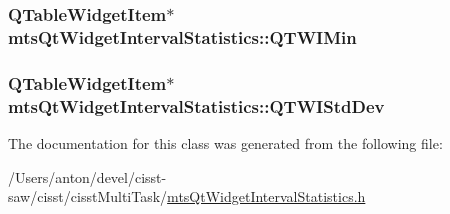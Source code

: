 \subsubsection[{Q\+T\+W\+I\+Min}]{\setlength{\rightskip}{0pt plus 5cm}Q\+Table\+Widget\+Item$\ast$ mts\+Qt\+Widget\+Interval\+Statistics\+::\+Q\+T\+W\+I\+Min\hspace{0.3cm}{\ttfamily [protected]}}\label{classmts_qt_widget_interval_statistics_aea3548dcfa553d0e74440d7b8d6aa1a7}
\hypertarget{classmts_qt_widget_interval_statistics_aee0f20cac1a5a0b0f44389a5154ca58f}{}
\subsubsection[{Q\+T\+W\+I\+Std\+Dev}]{\setlength{\rightskip}{0pt plus 5cm}Q\+Table\+Widget\+Item$\ast$ mts\+Qt\+Widget\+Interval\+Statistics\+::\+Q\+T\+W\+I\+Std\+Dev\hspace{0.3cm}{\ttfamily [protected]}}\label{classmts_qt_widget_interval_statistics_aee0f20cac1a5a0b0f44389a5154ca58f}


The documentation for this class was generated from the following file\+:\begin{DoxyCompactItemize}
\item 
/\+Users/anton/devel/cisst-\/saw/cisst/cisst\+Multi\+Task/\hyperlink{mts_qt_widget_interval_statistics_8h}{mts\+Qt\+Widget\+Interval\+Statistics.\+h}\end{DoxyCompactItemize}
